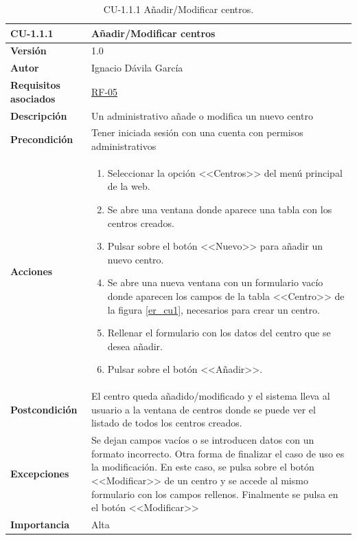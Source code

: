 \begin{table}[p]
\label{table:CU-1.1.1}
	\centering
	\begin{tabularx}{\linewidth}{ p{} p{} }
		\toprule
		\textbf{CU-1.1.1}    & \textbf{Añadir/Modificar centros}\\
		\toprule
		\textbf{Versión}              & 1.0    \\
		\textbf{Autor}                & Ignacio Dávila García \\
		\textbf{Requisitos asociados} & \hyperref[itm:RF5]{RF-05} \\
		\textbf{Descripción}          & Un administrativo añade o modifica un nuevo centro \\
		\textbf{Precondición}         & Tener iniciada sesión con una cuenta con permisos administrativos \\
		\textbf{Acciones}             &
		\begin{enumerate}
			\def\labelenumi{\arabic{enumi}.}
			\tightlist
			\item Seleccionar la opción <<Centros>> del menú principal de la web.
			\item Se abre una ventana donde aparece una tabla con los centros creados.
			\item Pulsar sobre el botón <<Nuevo>> para añadir un nuevo centro.
			\item Se abre una nueva ventana con un formulario vacío donde aparecen los campos de la tabla <<Centro>> de la figura \ref{er_cu1}, necesarios para crear un centro.
			\item Rellenar el formulario con los datos del centro que se desea añadir.
			\item Pulsar sobre el botón <<Añadir>>.
		\end{enumerate}\\
		\textbf{Postcondición}        & El centro queda añadido/modificado y el sistema lleva al usuario a la ventana de centros donde se puede ver el listado de todos los centros creados. \\
		\textbf{Excepciones}          & Se dejan campos vacíos o se introducen datos con un formato incorrecto. Otra forma de finalizar el caso de uso es la modificación. En este caso, se pulsa sobre el botón <<Modificar>> de un centro y se accede al mismo formulario con los campos rellenos. Finalmente se pulsa en el botón <<Modificar>> \\
		\textbf{Importancia}          & Alta \\
		\bottomrule
	\end{tabularx}
	\caption{CU-1.1.1 Añadir/Modificar centros.}
\end{table}
\FloatBarrier

